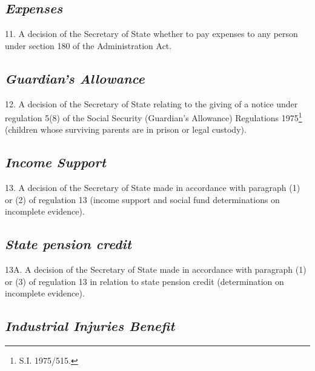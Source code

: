 \documentclass[12pt,a4paper]{article}
\begin{document}
\subsection*{\itshape Expenses}

11.  A decision of the Secretary of State whether to pay expenses to any person under section 180 of the Administration Act.

\subsection*{\itshape Guardian’s Allowance}

12.  A decision of the Secretary of State relating to the giving of a notice under regulation 5(8) of the Social Security (Guardian’s Allowance) Regulations 1975\footnote{\frenchspacing S.I. 1975/515.} (children whose surviving parents are in prison or legal custody).

\subsection*{\itshape Income Support}

13.  A decision of the Secretary of State 
made in accordance with paragraph (1) or (2) of regulation 13 (income support and social fund determinations on incomplete evidence).


\subsection*{\itshape State pension credit}

13A.  A decision of the Secretary of State made in accordance with paragraph (1) or (3) of regulation 13 in relation to state pension credit (determination on incomplete evidence).


\subsection*{\itshape Industrial Injuries Benefit}
\end{document}
